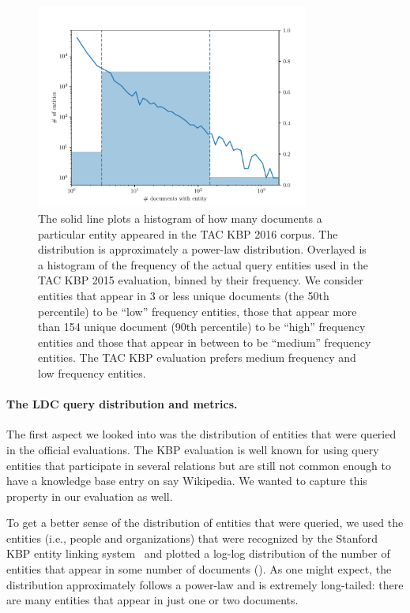 \begin{figure}
  \centering
  \includegraphics[width=0.8\textwidth]{figures/analysis/distribution}
  \caption[TAC KBP 2015 Query entity distribution]{\label{fig:kbpo:distribution}
    The solid line plots a histogram of how many documents a particular entity appeared in the TAC KBP 2016 corpus.
    The distribution is approximately a power-law distribution.
    Overlayed is a histogram of the frequency of the actual query entities used in the TAC KBP 2015 evaluation, binned by their frequency. We consider entities that appear in 3 or less unique documents (the 50th percentile) to be ``low'' frequency entities, those that appear more than 154 unique document (90th percentile) to be ``high'' frequency entities and those that appear in between to be ``medium'' frequency entities.
    The TAC KBP evaluation prefers medium frequency and low frequency entities.
  }
\end{figure}

\paragraph{The LDC query distribution and metrics.}
The first aspect we looked into was the distribution of entities that were queried in the official evaluations. 
The KBP evaluation is well known for using query entities that participate in several relations but are still not common enough to have a knowledge base entry on say Wikipedia.
We wanted to capture this property in our evaluation as well.

To get a better sense of the distribution of entities that were queried, we used the entities (i.e., people and organizations) that were recognized by the Stanford KBP entity linking system~\citet{stanford2017kbp}  and plotted a log-log distribution of the number of entities that appear in some number of documents ().
As one might expect, the distribution approximately follows a power-law and is extremely long-tailed: there are many entities that appear in just one or two documents. 

